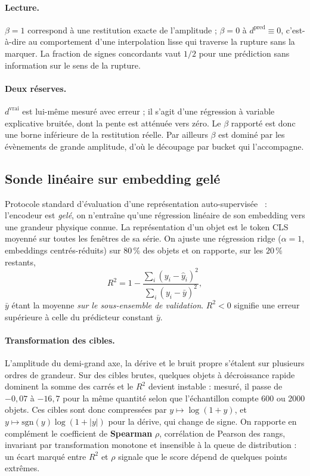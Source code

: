 \documentclass{article}
\begin{document}
\paragraph{Lecture.} $\beta = 1$ correspond à une restitution exacte de l'amplitude ; $\beta = 0$ à $d^{\text{pred}} \equiv 0$, c'est-à-dire au comportement d'une interpolation lisse qui traverse la rupture sans la marquer. La fraction de signes concordants vaut $1/2$ pour une prédiction sans information sur le sens de la rupture.

\paragraph{Deux réserves.} $d^{\text{vrai}}$ est lui-même mesuré avec erreur ; il s'agit d'une régression à variable explicative bruitée, dont la pente est atténuée vers zéro. Le $\beta$ rapporté est donc une borne inférieure de la restitution réelle. Par ailleurs $\beta$ est dominé par les évènements de grande amplitude, d'où le découpage par bucket qui l'accompagne.

\subsection{Sonde linéaire sur embedding gelé}

Protocole standard d'évaluation d'une représentation auto-supervisée~\cite{he2022mae} : l'encodeur est \emph{gelé}, on n'entraîne qu'une régression linéaire de son embedding vers une grandeur physique connue. La représentation d'un objet est le token CLS moyenné sur toutes les fenêtres de sa série. On ajuste une régression ridge ($\alpha = 1$, embeddings centrés-réduits) sur $80\,\%$ des objets et on rapporte, sur les $20\,\%$ restants,
\begin{equation}
R^2 = 1 - \frac{\sum_i (y_i - \hat{y}_i)^2}{\sum_i (y_i - \bar{y})^2},
\end{equation}
$\bar{y}$ étant la moyenne \emph{sur le sous-ensemble de validation}. $R^2 < 0$ signifie une erreur supérieure à celle du prédicteur constant $\bar{y}$.

\paragraph{Transformation des cibles.} L'amplitude du demi-grand axe, la dérive et le bruit propre s'étalent sur plusieurs ordres de grandeur. Sur des cibles brutes, quelques objets à décroissance rapide dominent la somme des carrés et le $R^2$ devient instable : mesuré, il passe de $-0{,}07$ à $-16{,}7$ pour la même quantité selon que l'échantillon compte 600 ou 2000 objets. Ces cibles sont donc compressées par $y \mapsto \log(1+y)$, et $y \mapsto \mathrm{sgn}(y)\log(1+|y|)$ pour la dérive, qui change de signe. On rapporte en complément le coefficient de \textbf{Spearman} $\rho$, corrélation de Pearson des rangs, invariant par transformation monotone et insensible à la queue de distribution : un écart marqué entre $R^2$ et $\rho$ signale que le score dépend de quelques points extrêmes.
\end{document}
